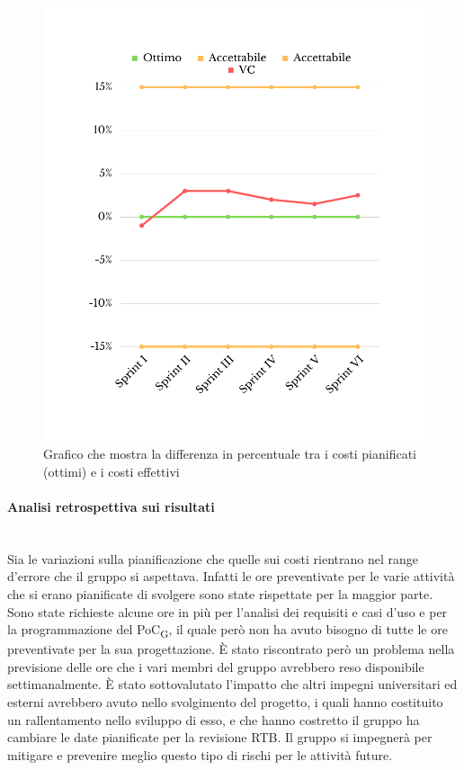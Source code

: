 \begin{figure}[H]
	\centering
	\includegraphics[scale=0.5]{img/CV.png}
	\caption{Grafico che mostra la differenza in percentuale tra i costi pianificati (ottimi) e i costi effettivi}
\end{figure}
\paragraph{Analisi retrospettiva sui risultati}\mbox{}\\
Sia le variazioni sulla pianificazione che quelle sui costi rientrano nel range d'errore che il gruppo si aspettava. Infatti le ore preventivate per le varie attività che si erano pianificate di svolgere sono state rispettate per la maggior parte. Sono state richieste alcune ore in più per l'analisi dei requisiti e casi d'uso e per la programmazione del PoC\textsubscript{G}, il quale però non ha avuto bisogno di tutte le ore preventivate per la sua progettazione. È stato riscontrato però un problema nella previsione delle ore che i vari membri del gruppo avrebbero reso disponibile settimanalmente. È stato sottovalutato l'impatto che altri impegni universitari ed esterni avrebbero avuto nello svolgimento del progetto, i quali hanno costituito un rallentamento nello sviluppo di esso, e che hanno costretto il gruppo ha cambiare le date pianificate per la revisione RTB. Il gruppo si impegnerà per mitigare e prevenire meglio questo tipo di rischi per le attività future.
